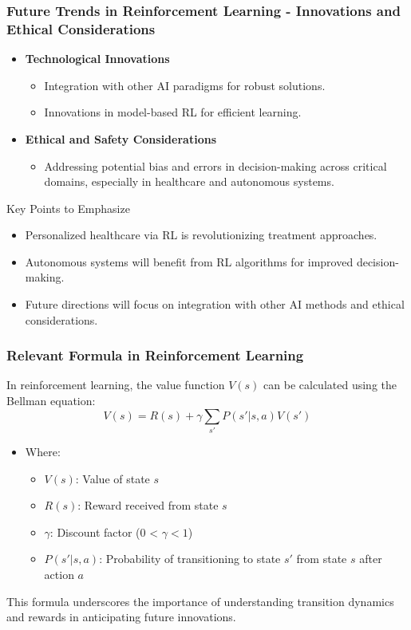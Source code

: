 \documentclass[aspectratio=169]{beamer}
\begin{document}
\begin{frame}[fragile]
    \frametitle{Future Trends in Reinforcement Learning - Innovations and Ethical Considerations}
    \begin{itemize}
        \item \textbf{Technological Innovations}
        \begin{itemize}
            \item Integration with other AI paradigms for robust solutions.
            \item Innovations in model-based RL for efficient learning.
        \end{itemize}
        \item \textbf{Ethical and Safety Considerations}
        \begin{itemize}
            \item Addressing potential bias and errors in decision-making across critical domains, especially in healthcare and autonomous systems.
        \end{itemize}
    \end{itemize}
    \begin{block}{Key Points to Emphasize}
        \begin{itemize}
            \item Personalized healthcare via RL is revolutionizing treatment approaches.
            \item Autonomous systems will benefit from RL algorithms for improved decision-making.
            \item Future directions will focus on integration with other AI methods and ethical considerations.
        \end{itemize}
    \end{block}
\end{frame}

\begin{frame}[fragile]
    \frametitle{Relevant Formula in Reinforcement Learning}
    In reinforcement learning, the value function \( V(s) \) can be calculated using the Bellman equation:
    \begin{equation}
        V(s) = R(s) + \gamma \sum_{s'} P(s'|s, a)V(s')
    \end{equation}
    \begin{itemize}
        \item Where:
        \begin{itemize}
            \item \( V(s) \): Value of state \( s \)
            \item \( R(s) \): Reward received from state \( s \)
            \item \( \gamma \): Discount factor (0 < \( \gamma < 1 \))
            \item \( P(s'|s, a) \): Probability of transitioning to state \( s' \) from state \( s \) after action \( a \)
        \end{itemize}
    \end{itemize}
    This formula underscores the importance of understanding transition dynamics and rewards in anticipating future innovations.
\end{frame}
\end{document}
